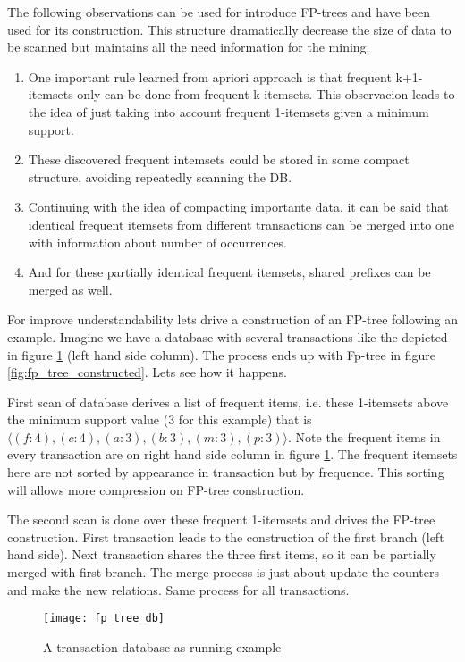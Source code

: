 The following observations can be used for introduce FP-trees and have been used
for its construction. This structure dramatically decrease the size of data to be 
scanned but maintains all the need information for the mining.

\begin{enumerate}[label=\roman*)]
  \item One important rule learned from apriori approach is that frequent
    k+1-itemsets only can be done from frequent k-itemsets. This observacion
    leads to the idea of just taking into account frequent 1-itemsets given a
    minimum support.
  \item These discovered frequent intemsets could be stored in some compact
    structure, avoiding repeatedly scanning the DB.
  \item Continuing with the idea of compacting importante data, it can be said
    that identical frequent itemsets from different transactions can be merged
    into one with information about number of occurrences.
  \item And for these partially identical frequent itemsets, shared prefixes can
    be merged as well.
\end{enumerate}

For improve understandability lets drive a construction of an FP-tree following an
example. Imagine we have a database with several transactions like the depicted
in figure \ref{fig:fp_tree_db} (left hand side column). The process ends up with
Fp-tree in figure \ref{fig:fp_tree_constructed}. Lets see how it happens. 

First scan of database derives a list of frequent items, i.e. these 1-itemsets 
above the minimum support value (3 for this example) that is $\langle
(f:4),(c:4),(a:3),(b:3),(m:3),(p:3) \rangle$. Note the frequent items in every
transaction are on right hand side column in figure \ref{fig:fp_tree_db}. The
frequent itemsets here are not sorted by appearance in transaction but by
frequence. This sorting will allows more compression on FP-tree construction.

The second scan is done over these frequent 1-itemsets and drives the
FP-tree construction. First transaction leads to the construction of the first
branch (left hand side). Next transaction shares the three first items, so
it can be partially merged with first branch. The merge process is just about
update the counters and make the new relations. Same process for all
transactions.

\begin{figure}
  \centering
  \texttt{[image: fp\_tree\_db]}
  \caption{A transaction database as running example}
  \label{fig:fp_tree_db}
\end{figure}

